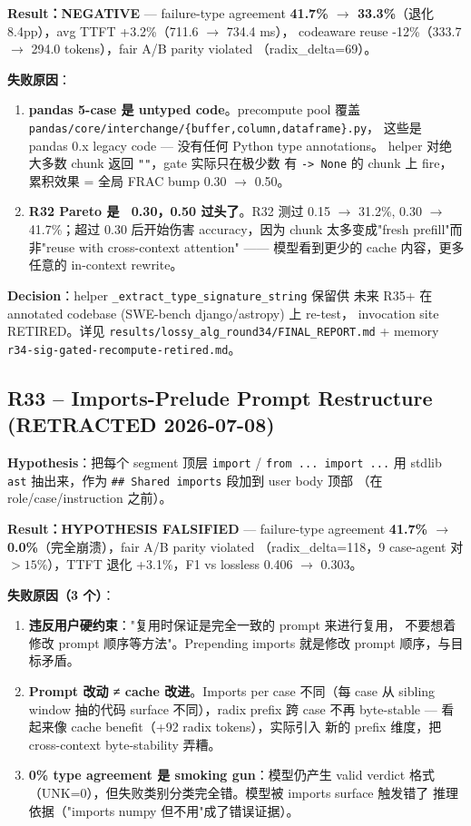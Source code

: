 \documentclass[11pt,a4paper]{article}
\begin{document}
\begin{itemize}
\textbf{Result：NEGATIVE} --- failure-type agreement
\textbf{41.7\% $\to$ 33.3\%}（退化 8.4pp），avg TTFT +3.2\%（711.6 $\to$ 734.4 ms），
codeaware reuse -12\%（333.7 $\to$ 294.0 tokens），fair A/B parity violated
（radix\_delta=69）。

\textbf{失败原因}：
\begin{enumerate}
  \item \textbf{pandas 5-case 是 untyped code}。precompute pool 覆盖
        \texttt{pandas/core/interchange/\{buffer,column,dataframe\}.py}，
        这些是 pandas 0.x legacy code — 没有任何 Python type annotations。
        helper 对绝大多数 chunk 返回 \texttt{""}，gate 实际只在极少数
        有 \texttt{-> None} 的 chunk 上 fire，累积效果 = 全局 FRAC bump
        0.30 $\to$ 0.50。
  \item \textbf{R32 Pareto 是 ~0.30，0.50 过头了}。R32 测过 0.15 $\to$ 31.2\%,
        0.30 $\to$ 41.7\%；超过 0.30 后开始伤害 accuracy，因为
        chunk 太多变成"fresh prefill"而非"reuse with cross-context
        attention" —— 模型看到更少的 cache 内容，更多任意的
        in-context rewrite。
\end{enumerate}

\textbf{Decision}：helper \texttt{\_extract\_type\_signature\_string} 保留供
未来 R35+ 在 annotated codebase (SWE-bench django/astropy) 上 re-test，
invocation site RETIRED。详见
\texttt{results/lossy\_alg\_round34/FINAL\_REPORT.md} +
memory \texttt{r34-sig-gated-recompute-retired.md}。

\subsection*{R33 -- Imports-Prelude Prompt Restructure \textbf{(RETRACTED 2026-07-08)}}

\textbf{Hypothesis}：把每个 segment 顶层 \texttt{import} / \texttt{from ... import ...}
用 stdlib \texttt{ast} 抽出来，作为 \texttt{## Shared imports} 段加到 user body 顶部
（在 role/case/instruction 之前）。

\textbf{Result：HYPOTHESIS FALSIFIED} --- failure-type agreement
\textbf{41.7\% $\to$ 0.0\%}（完全崩溃），fair A/B parity violated
（radix\_delta=118，9 case-agent 对 $>15$\%），TTFT 退化 +3.1\%，F1 vs lossless
0.406 $\to$ 0.303。

\textbf{失败原因（3 个）}：
\begin{enumerate}
  \item \textbf{违反用户硬约束}："复用时保证是完全一致的 prompt 来进行复用，
        不要想着修改 prompt 顺序等方法"。Prepending imports 就是修改 prompt
        顺序，与目标矛盾。
  \item \textbf{Prompt 改动 ≠ cache 改进}。Imports per case 不同（每 case
        从 sibling window 抽的代码 surface 不同），radix prefix 跨 case 不再
        byte-stable — 看起来像 cache benefit（+92 radix tokens），实际引入
        新的 prefix 维度，把 cross-context byte-stability 弄糟。
  \item \textbf{0\% type agreement 是 smoking gun}：模型仍产生 valid verdict
        格式（UNK=0），但失败类别分类完全错。模型被 imports surface 触发错了
        推理依据（"imports numpy 但不用"成了错误证据）。
\end{enumerate}


\end{itemize}
\end{document}
